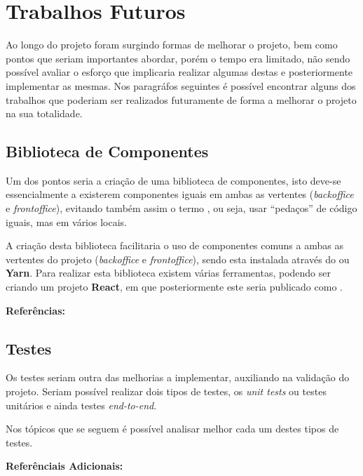 \section{Trabalhos Futuros}

Ao longo do projeto foram surgindo formas de melhorar o projeto, bem como pontos que seriam importantes abordar, porém o tempo era limitado, não sendo possível avaliar o esforço que implicaria realizar algumas destas e posteriormente implementar as mesmas. Nos paragráfos seguintes é possível encontrar alguns dos trabalhos que poderiam ser realizados futuramente de forma a melhorar o projeto na sua totalidade.

\subsection{Biblioteca de Componentes}

Um dos pontos seria a criação de uma biblioteca de componentes, isto deve-se essencialmente a existerem componentes iguais em ambas as vertentes (\textit{backoffice} e \textit{frontoffice}), evitando também assim o termo \textbf{\textit{}}, ou seja, usar ``pedaços'' de código iguais, mas em vários locais.

A criação desta biblioteca facilitaria o uso de componentes comuns a ambas as vertentes do projeto (\textit{backoffice} e \textit{frontoffice}), sendo esta instalada através do \textbf{} ou \textbf{Yarn}. Para realizar esta biblioteca existem várias ferramentas, podendo ser criando um projeto \textbf{React}, em que posteriormente este seria publicado como .

\textbf{Referências:} \cite{publishReactPackage,createLibReact}

\subsection{Testes}

Os testes seriam outra das melhorias a implementar, auxiliando na validação do projeto.  Seriam possível realizar dois tipos de testes, os \textit{unit tests} ou testes unitários e ainda testes \textit{end-to-end}.

Nos tópicos que se seguem é possível analisar melhor cada um destes tipos de testes.

\vspace{20pt}

\textbf{Referênciais Adicionais:} \cite{reactEndToEndGuide,jestReact,endToEndCypress,endToEndJestPuppeteer,endToEndWJest,unitTestsReact,reactTesting,modernCypressTesting}

